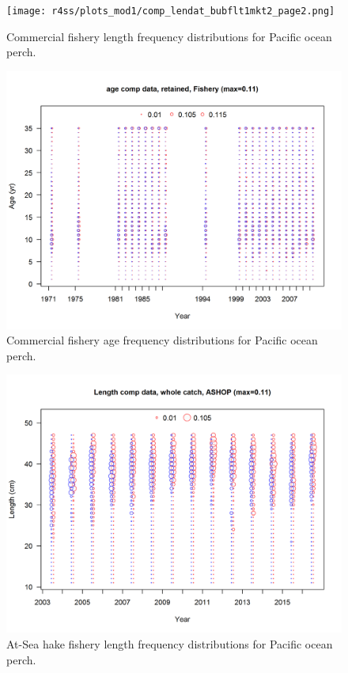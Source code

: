 \documentclass[12pt,]{article}
\begin{document}
\FloatBarrier

\begin{figure}
\centering
\texttt{[image: r4ss/plots\_mod1/comp\_lendat\_bubflt1mkt2\_page2.png]}
\caption{Commercial fishery length frequency distributions for Pacific
ocean perch. \label{fig:Comm_Length}}
\end{figure}

\FloatBarrier

\begin{figure}
\centering
\includegraphics{r4ss/plots_mod1/comp_agedat_bubflt1mkt2.png}
\caption{Commercial fishery age frequency distributions for Pacific
ocean perch. \label{fig:Comm_Age}}
\end{figure}

\FloatBarrier

\begin{figure}
\centering
\includegraphics{r4ss/plots_mod1/comp_lendat_bubflt2mkt0.png}
\caption{At-Sea hake fishery length frequency distributions for Pacific
ocean perch. \label{fig:ASHOP_Length}}
\end{figure}
\end{document}
